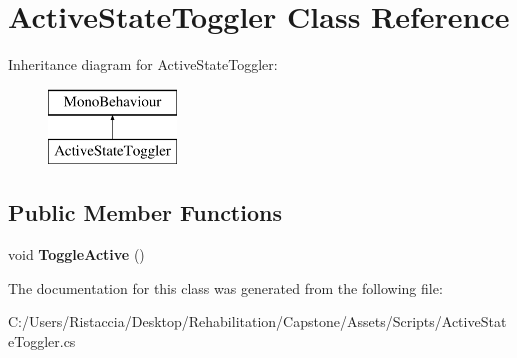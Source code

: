 \hypertarget{class_active_state_toggler}{}\section{Active\+State\+Toggler Class Reference}
\label{class_active_state_toggler}
Inheritance diagram for Active\+State\+Toggler\+:\begin{figure}[H]
\begin{center}
\leavevmode
\includegraphics[height=2.000000cm]{class_active_state_toggler}
\end{center}
\end{figure}
\subsection*{Public Member Functions}
\begin{DoxyCompactItemize}
\item 
\mbox{\label{class_active_state_toggler_aab2ab12e4b164011dbc628f65dc09449}} 
void {\bfseries Toggle\+Active} ()
\end{DoxyCompactItemize}


The documentation for this class was generated from the following file\+:\begin{DoxyCompactItemize}
\item 
C\+:/\+Users/\+Ristaccia/\+Desktop/\+Rehabilitation/\+Capstone/\+Assets/\+Scripts/Active\+State\+Toggler.\+cs\end{DoxyCompactItemize}

